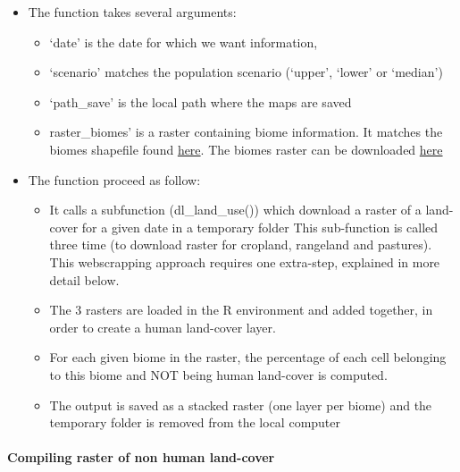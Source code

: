 \documentclass[]{article}
\providecommand{\tightlist}{%
  \setlength{\itemsep}{0pt}\setlength{\parskip}{0pt}}
\let\oldparagraph\paragraph
\renewcommand{\paragraph}[1]{\oldparagraph{#1}\mbox{}}
\begin{document}
\begin{itemize}
\tightlist
\item
  The function takes several arguments:

  \begin{itemize}
  \tightlist
  \item
    `date' is the date for which we want information,\\
  \item
    `scenario' matches the population scenario (`upper', `lower' or
    `median')\\
  \item
    `path\_save' is the local path where the maps are saved\\
  \item
    raster\_biomes' is a raster containing biome information. It matches
    the biomes shapefile found
    \href{https://www.worldwildlife.org/publications/terrestrial-ecoregions-of-the-world}{here}.
    The biomes raster can be downloaded
    \href{https://github.com/vpellissier/holocene_biomes_dynamic/raw/master/Original\%20data/biomes.tif}{here}
  \end{itemize}
\item
  The function proceed as follow:

  \begin{itemize}
  \tightlist
  \item
    It calls a subfunction (dl\_land\_use()) which download a raster of
    a land-cover for a given date in a temporary folder This
    sub-function is called three time (to download raster for cropland,
    rangeland and pastures). This webscrapping approach requires one
    extra-step, explained in more detail below.
  \item
    The 3 rasters are loaded in the R environment and added together, in
    order to create a human land-cover layer.
  \item
    For each given biome in the raster, the percentage of each cell
    belonging to this biome and NOT being human land-cover is computed.
  \item
    The output is saved as a stacked raster (one layer per biome) and
    the temporary folder is removed from the local computer
  \end{itemize}
\end{itemize}

\paragraph{Compiling raster of non human
land-cover}\label{compiling-raster-of-non-human-land-cover}
\end{document}
